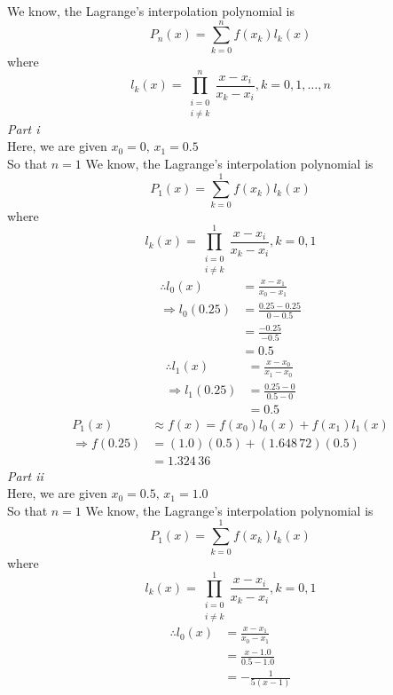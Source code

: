 \documentclass[12pt,class=book,crop=false]{standalone}
\begin{document}
\begin{soln}
    We know, the Lagrange's interpolation polynomial is
    \[
        P_n(x)=\sum_{k=0}^nf(x_k)l_k(x)
    \]
    where
    \[
        l_k(x)=\prod_{\substack{i=0\\ i\neq k}}^n\frac{x-x_i}{x_k-x_i}, k=0,1,\dots,n
    \]
    \emph{Part i}\\
    Here, we are given \(  x_0=0,\,x_1=0.5 \)\\So that \(  n=1 \)
    We know, the Lagrange's interpolation polynomial is
    \[
        P_1(x)=\sum_{k=0}^1f(x_k)l_k(x)
    \]
    where
    \[
        l_k(x)=\prod_{\substack{i=0\\ i\neq k}}^1\frac{x-x_i}{x_k-x_i}, k=0,1
    \]
    \begin{align*}
        \therefore l_0(x)     & = \frac{x-x_1}{x_0-x_1}   \\
        \Rightarrow l_0(0.25) & = \frac{0.25-0.25}{0-0.5} \\
                              & = \frac{-0.25}{-0.5}      \\
                              & =0.5
    \end{align*}
    \begin{align*}
        \therefore l_1(x)     & = \frac{x-x_0}{x_1-x_0} \\
        \Rightarrow l_1(0.25) & = \frac{0.25-0}{0.5-0}  \\
                              & =0.5
    \end{align*}
    \begin{align*}
        P_1(x)              & \approx f(x) = f(x_0)l_0(x)+f(x_1)l_1(x) \\
        \Rightarrow f(0.25) & = (1.0)(0.5)+(1.648\,72)(0.5)              \\
                            & =1.324\,36
    \end{align*}
    \emph{Part ii}\\
    Here, we are given \(  x_0=0.5,\,x_1=1.0 \)\\So that \(  n=1 \)
    We know, the Lagrange's interpolation polynomial is
    \[
        P_1(x)=\sum_{k=0}^1f(x_k)l_k(x)
    \]
    where
    \[
        l_k(x)=\prod_{\substack{i=0\\ i\neq k}}^1\frac{x-x_i}{x_k-x_i}, k=0,1
    \]
    \begin{align*}
        \therefore l_0(x) & = \frac{x-x_1}{x_0-x_1} \\
                          & = \frac{x-1.0}{0.5-1.0} \\
                          & = -\frac{1}{5(x-1)}     \\

\end{align*}
\end{soln}
\end{document}
